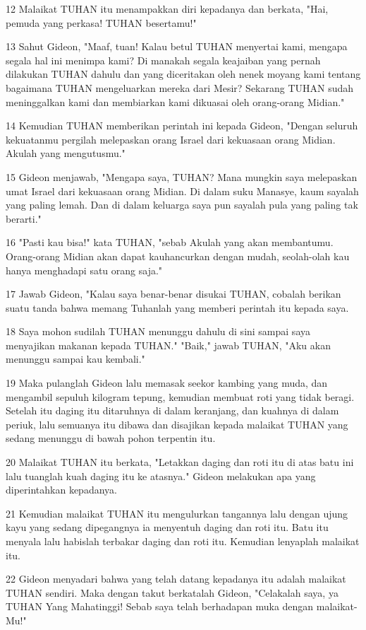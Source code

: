 \par 12 Malaikat TUHAN itu menampakkan diri kepadanya dan berkata, "Hai, pemuda yang perkasa! TUHAN besertamu!"
\par 13 Sahut Gideon, "Maaf, tuan! Kalau betul TUHAN menyertai kami, mengapa segala hal ini menimpa kami? Di manakah segala keajaiban yang pernah dilakukan TUHAN dahulu dan yang diceritakan oleh nenek moyang kami tentang bagaimana TUHAN mengeluarkan mereka dari Mesir? Sekarang TUHAN sudah meninggalkan kami dan membiarkan kami dikuasai oleh orang-orang Midian."
\par 14 Kemudian TUHAN memberikan perintah ini kepada Gideon, "Dengan seluruh kekuatanmu pergilah melepaskan orang Israel dari kekuasaan orang Midian. Akulah yang mengutusmu."
\par 15 Gideon menjawab, "Mengapa saya, TUHAN? Mana mungkin saya melepaskan umat Israel dari kekuasaan orang Midian. Di dalam suku Manasye, kaum sayalah yang paling lemah. Dan di dalam keluarga saya pun sayalah pula yang paling tak berarti."
\par 16 "Pasti kau bisa!" kata TUHAN, "sebab Akulah yang akan membantumu. Orang-orang Midian akan dapat kauhancurkan dengan mudah, seolah-olah kau hanya menghadapi satu orang saja."
\par 17 Jawab Gideon, "Kalau saya benar-benar disukai TUHAN, cobalah berikan suatu tanda bahwa memang Tuhanlah yang memberi perintah itu kepada saya.
\par 18 Saya mohon sudilah TUHAN menunggu dahulu di sini sampai saya menyajikan makanan kepada TUHAN." "Baik," jawab TUHAN, "Aku akan menunggu sampai kau kembali."
\par 19 Maka pulanglah Gideon lalu memasak seekor kambing yang muda, dan mengambil sepuluh kilogram tepung, kemudian membuat roti yang tidak beragi. Setelah itu daging itu ditaruhnya di dalam keranjang, dan kuahnya di dalam periuk, lalu semuanya itu dibawa dan disajikan kepada malaikat TUHAN yang sedang menunggu di bawah pohon terpentin itu.
\par 20 Malaikat TUHAN itu berkata, "Letakkan daging dan roti itu di atas batu ini lalu tuanglah kuah daging itu ke atasnya." Gideon melakukan apa yang diperintahkan kepadanya.
\par 21 Kemudian malaikat TUHAN itu mengulurkan tangannya lalu dengan ujung kayu yang sedang dipegangnya ia menyentuh daging dan roti itu. Batu itu menyala lalu habislah terbakar daging dan roti itu. Kemudian lenyaplah malaikat itu.
\par 22 Gideon menyadari bahwa yang telah datang kepadanya itu adalah malaikat TUHAN sendiri. Maka dengan takut berkatalah Gideon, "Celakalah saya, ya TUHAN Yang Mahatinggi! Sebab saya telah berhadapan muka dengan malaikat-Mu!"
